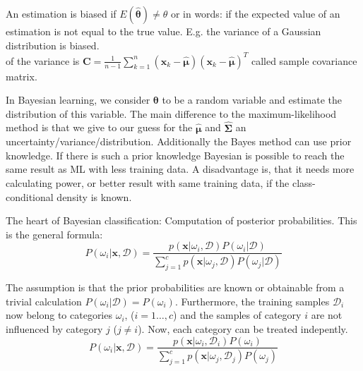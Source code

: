   An estimation is biased if $E(\boldsymbol{\hat{\theta}}) \neq \theta$ or in words: if the expected 
  value of an estimation is not equal to the true value.
  E.g. the variance of a Gaussian distribution is biased.\\
   of the variance is $\boldsymbol{C} = \frac1{n-1} \sum\limits_{k=1}^n 
  (\boldsymbol{x}_k - \boldsymbol{\hat{\mu}})(\boldsymbol{x}_k - \boldsymbol{\hat{\mu}})^T$ called sample covariance matrix.
  
  
  In Bayesian learning, we consider $\boldsymbol{\theta}$ to be a random variable and estimate the distribution of this variable.
  The main difference to the maximum-likelihood method is that we give to our guess for the $\boldsymbol{\hat{\mu}}$ and $\boldsymbol{\hat{\Sigma}}$ an 
   uncertainty\slash{}variance\slash{}distribution. Additionally the Bayes method can use prior knowledge. If there is such a prior knowledge Bayesian is possible 
   to reach the same result as ML with less training data. A disadvantage is, that it needs more calculating power, or better result with same training data, if the class-conditional density is known.
  
  The heart of Bayesian classification: Computation of posterior probabilities. This is the 
  general formula:
  $$P(\omega_i|\bm{x}, \mathcal{D}) = \frac{p(\bm{x}|\omega_i, \mathcal{D}) P(\omega_i|\mathcal{D})}
    {\sum\limits_{j=1}^{c} p(\bm{x}|\omega_j, \mathcal{D}) P(\omega_j|\mathcal{D})}$$
    
    
  The assumption is that the prior probabilities are known or obtainable from a trivial calculation $P(\omega_i|\mathcal{D})=P(\omega_i)$.
  Furthermore, the training samples $\mathcal{D}_i$ now belong to categories $\omega_i$, 
  ($i=1\ldots,c$) and the samples of category $i$ are not influenced by category $j$ ($j \neq i$).
  Now, each category can be treated indepently.
  $$P(\omega_i|\bm{x}, \mathcal{D}) = \frac{p(\bm{x}|\omega_i, \mathcal{D}_i) P(\omega_i)}
    {\sum\limits_{j=1}^{c} p(\bm{x}|\omega_j, \mathcal{D}_j) P(\omega_j)}$$
    
